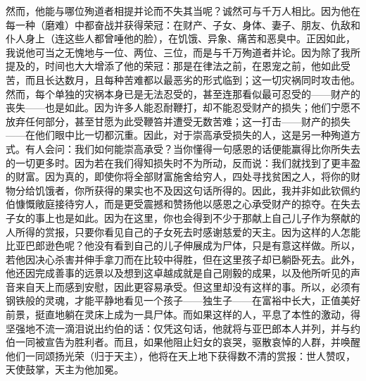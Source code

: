 然而，他能与哪位殉道者相提并论而不失其当呢？诚然可与千万人相比。因为他在每一种（磨难）中都奋战并获得荣冠：在财产、子女、身体、妻子、朋友、仇敌和仆人身上（连这些人都曾唾他的脸），在饥饿、异象、痛苦和恶臭中。正因如此，我说他可当之无愧地与一位、两位、三位，而是与千万殉道者并论。因为除了我所提及的，时间也大大增添了他的荣冠：那是在律法之前，在恩宠之前，他如此受苦，而且长达数月，且每种苦难都以最恶劣的形式临到；这一切灾祸同时攻击他。然而，每个单独的灾祸本身已是无法忍受的，甚至连那看似最可忍受的——财产的丧失——也是如此。因为许多人能忍耐鞭打，却不能忍受财产的损失；他们宁愿不放弃任何部分，甚至甘愿为此受鞭笞并遭受无数苦难；这一打击——财产的损失——在他们眼中比一切都沉重。因此，对于崇高承受损失的人，这是另一种殉道方式。有人会问：我们如何能崇高承受？当你懂得一句感恩的话便能赢得比你所失去的一切更多时。因为若在我们得知损失时不为所动，反而说：我们就找到了更丰盈的财富。因为真的，即使你将全部财富施舍给穷人，四处寻找贫困之人，将你的财物分给饥饿者，你所获得的果实也不及因这句话所得的。因此，我并非如此钦佩约伯慷慨敞庭接待穷人，而是更受震撼和赞扬他以感恩之心承受财产的掠夺。在失去子女的事上也是如此。因为在这里，你也会得到不少于那献上自己儿子作为祭献的人所得的赏报，只要你看见自己的子女死去时感谢慈爱的天主。因为这样的人怎能比亚巴郎逊色呢？他没有看到自己的儿子伸展成为尸体，只是有意这样做。所以，若他因决心杀害并伸手拿刀而在比较中得胜，但在这里孩子却已躺卧死去。此外，他还因完成善事的远景以及想到这卓越成就是自己刚毅的成果，以及他所听见的声音来自天上而感到安慰，因此更容易承受。但这里却没有这样的事。所以，必须有钢铁般的灵魂，才能平静地看见一个孩子——独生子——在富裕中长大，正值美好前景，挺直地躺在灵床上成为一具尸体。而如果这样的人，平息了本性的激动，得坚强地不流一滴泪说出约伯的话：仅凭这句话，他就将与亚巴郎本人并列，并与约伯一同被宣告为胜利者。而且，如果他阻止妇女的哀哭，驱散哀悼的人群，并唤醒他们一同颂扬光荣（归于天主），他将在天上地下获得数不清的赏报：世人赞叹，天使鼓掌，天主为他加冕。\par

